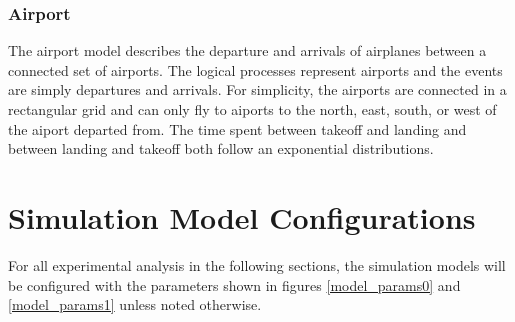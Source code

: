 \documentclass[11pt]{book}
\begin{document}
\subsection{Airport}

The airport model describes the departure and arrivals of airplanes between a connected
set of airports. The logical processes represent airports and the events are simply
departures and arrivals. For simplicity, the airports are connected in a rectangular grid
and can only fly to aiports to the north, east, south, or west of the aiport departed from.
The time spent between takeoff and landing and between landing and takeoff both follow an
exponential distributions.

\chapter{Simulation Model Configurations}\label{model_configurations}

For all experimental analysis in the following sections, the simulation models will be configured
with the parameters shown in figures \ref{model_params0} and \ref{model_params1} unless noted
otherwise.
\end{document}
